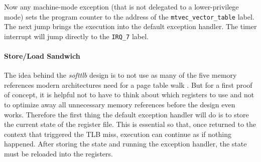 Now any machine-mode exception (that is not delegated to a lower-privilege mode) sets the program counter
to the address of the \texttt{mtvec\_vector\_table} label. The next jump brings the execution into
the default exception handler.
The timer interrupt will jump directly to the \texttt{IRQ\_7} label.

\paragraph{Store/Load Sandwich} The idea behind the \textit{softtlb} design is to not use as many of the five
memory references modern architectures need for a page table walk \cite{intel5LevelPaging5Level2017}. But
for a first proof of concept, it is helpful not to have to think about which registers to use and not to optimize
away all unnecessary memory references before the design even works.
Therefore the first thing the default exception handler will do is to store the current state of the register
file.
This is essential so that, once returned to the context that triggered the TLB miss, execution can continue
as if nothing happened.
After storing the state and running the exception handler, the state must be reloaded into the registers.

